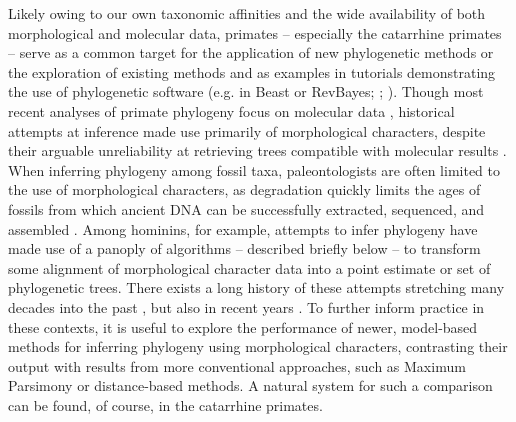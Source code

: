 \documentclass[10pt, twocolumn, twoside]{article}
\begin{document}
Likely owing to our own taxonomic affinities and the wide availability of both morphological and molecular data, primates -- especially the catarrhine primates --  serve as a common target for the application of new phylogenetic methods or the exploration of existing methods \citep[e.g.][]{reisUsingPhylogenomicData2018} and as examples in tutorials demonstrating the use of phylogenetic software (e.g. in Beast or RevBayes; \citealt{bouckaertBEASTAdvancedSoftware2019}; \citealt{hohnaRevBayesBayesianPhylogenetic2016a}). Though most recent analyses of primate phylogeny focus on molecular data \citep[e.g.][]{perelmanMolecularPhylogenyLiving2011, springerMacroevolutionaryDynamicsHistorical2012}, historical attempts at inference made use primarily of morphological characters, despite their arguable unreliability at retrieving trees compatible with molecular results \citep[e.g.][]{collardHowReliableAre2000, gibbsSofttissueCharactersHigher2000, varon-gonzalezEstimatingPhylogeniesShape2020}. When inferring phylogeny among fossil taxa, paleontologists are often limited to the use of morphological characters, as degradation quickly limits the ages of fossils from which ancient DNA can be successfully extracted, sequenced, and assembled \citep{collinsSurvivalOrganicMatter2002, allentoftHalflifeDNABone2012, pickrellNewHistoryGeography2014}. Among hominins, for example, attempts to infer phylogeny have made use of a panoply of algorithms -- described briefly below -- to transform some alignment of morphological character data into a point estimate or set of phylogenetic trees. There exists a long history of these attempts stretching many decades into the past \citep[e.g.][]{chamberlainEarlyHominidPhylogeny1987, stringerNumericalCladisticAnalysis1987, skeltonEvolutionaryRelationshipsEarly1992, straitReappraisalEarlyHominid1997}, but also in recent years \citep[e.g.][]{irishDentalMorphologyPhylogenetic2013, demboBayesianAnalysisMorphological2015, demboEvolutionaryRelationshipsAge2016, argueAffinitiesHomoFloresiensis2017}. To further inform practice in these contexts, it is useful to explore the performance of newer, model-based methods for inferring phylogeny using morphological characters, contrasting their output with results from more conventional approaches, such as Maximum Parsimony or distance-based methods. A natural system for such a comparison can be found, of course, in the catarrhine primates.
\end{document}
